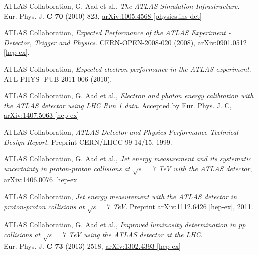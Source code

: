\documentclass[12pt, twoside]{article}
\numberwithin{equation}{section}
\numberwithin{figure}{section}
\begin{document}
\begin{thebibliography}{99}
 ATLAS Collaboration, G. Aad et al., \textit{The ATLAS Simulation Infrastructure}.\\
Eur. Phys. J. \textbf{C 70} (2010) 823, \href{http://arxiv.org/abs/1005.4568}{arXiv:1005.4568 [physics.ins-det]}

 ATLAS Collaboration, \textit{Expected Performance of the ATLAS Experiment - Detector, Trigger and Physics}. CERN-OPEN-2008-020 (2008), \href{http://arxiv.org/abs/0901.0512}{arXiv:0901.0512 [hep-ex]}.

 ATLAS Collaboration, \textit{Expected electron performance in the ATLAS experiment}. ATL-PHYS-
PUB-2011-006 (2010).

 ATLAS Collaboration, G. Aad et al., \textit{Electron and photon energy calibration with the ATLAS detector using LHC Run 1 data}. Accepted by Eur. Phys. J. C, \href{http://arxiv.org/abs/1407.5063}{arXiv:1407.5063 [hep-ex]}

 ATLAS Collaboration, \textit{ATLAS Detector and Physics Performance Technical Design Report}. Preprint CERN/LHCC 99-14/15, 1999.

 ATLAS Collaboration, G. Aad et al., \textit{Jet energy measurement and its systematic uncertainty in proton-proton collisions at $\sqrt{s}=7$ TeV with the ATLAS detector}, \href{http://arxiv.org/abs/1406.0076}{arXiv:1406.0076 [hep-ex]}

 ATLAS Collaboration, \textit{Jet energy measurement with the ATLAS detector in proton-proton collisions at $\sqrt{s} = 7$ TeV}. Preprint \href{http://arxiv.org/abs/1112.6426}{arXiv:1112.6426 [hep-ex]}, 2011.



 ATLAS Collaboration, G. Aad et al., \textit{Improved luminosity determination in pp collisions at $\sqrt{s} = 7$ TeV using the ATLAS detector at the LHC}.\\
Eur. Phys. J. \textbf{C 73} (2013) 2518, \href{http://arxiv.org/abs/1302.4393}{arXiv:1302.4393 [hep-ex]}

\end{thebibliography}


\newpage
\thispagestyle{empty}
\phantom{ }
\end{document}
